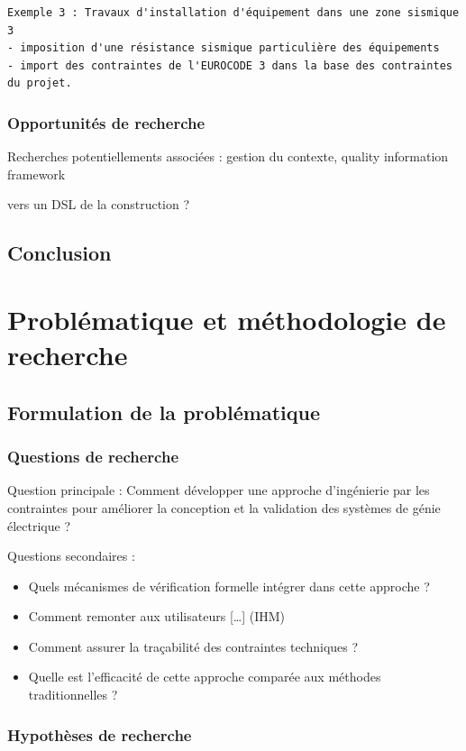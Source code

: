 \documentclass[a4paper,12pt]{article}
\begin{document}
\begin{verbatim}
Exemple 3 : Travaux d'installation d'équipement dans une zone sismique 3
- imposition d'une résistance sismique particulière des équipements
- import des contraintes de l'EUROCODE 3 dans la base des contraintes du projet.
\end{verbatim}
\subsubsection{Opportunités de recherche}
\label{sec:org9127ba2}
Recherches potentiellements associées : gestion du contexte, quality information framework

vers un DSL de la construction ?
\subsection{Conclusion}
\label{sec:orgc0d56de}
\clearpage
\section{Problématique et méthodologie de recherche}
\label{sec:orgdb8bff9}
\subsection{Formulation de la problématique}
\label{sec:orgadba33b}
\subsubsection{Questions de recherche}
\label{sec:org8fcad56}
Question principale : Comment développer une approche d'ingénierie par les contraintes pour améliorer la conception et la validation des systèmes de génie électrique ?

Questions secondaires :
\begin{itemize}
\item Quels mécanismes de vérification formelle intégrer dans cette approche ?
\item Comment remonter aux utilisateurs [\ldots{}] (IHM)
\item Comment assurer la traçabilité des contraintes techniques ?
\item Quelle est l'efficacité de cette approche comparée aux méthodes traditionnelles ?
\end{itemize}
\subsubsection{Hypothèses de recherche}
\label{sec:org447340c}
\end{document}
